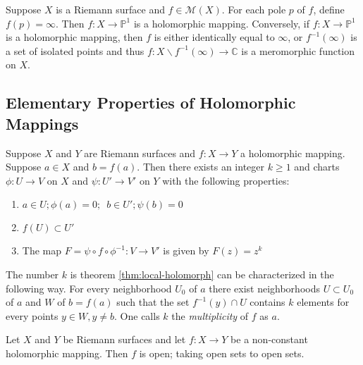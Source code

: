 \begin{thm}

Suppose $X$ is a Riemann surface and $f \in \mathcal{M}(X)$. For each pole $p$ of $f$, define $f(p)= \infty$. Then $f: X \to \mathbb{P}^1$ is a holomorphic mapping. Conversely, if $f: X \to \mathbb{P}^1$ is a holomorphic mapping, then $f$ is either identically equal to $\infty$, or $f^{-1}(\infty)$ is a set of isolated points and thus $f: X \backslash f^{-1}(\infty) \to \mathbb{C}$ is a meromorphic function on $X$.
\end{thm}

\subsection{Elementary Properties of Holomorphic Mappings}

\begin{thm}
\label{thm:local-holomorph}
Suppose $X$ and $Y$ are Riemann surfaces and $f: X \to Y$ a holomorphic mapping. Suppose $a \in X$ and $b = f(a)$. Then there exists an integer $k \geq 1$ and charts $\phi:U \to V$ on $X$ and $\psi: U' \to V'$ on $Y$ with the following properties:

\begin{enumerate}
    \item $a \in U; \phi(a)=0; \hspace{6pt} b \in U'; \psi(b)=0$
    \item $f(U) \subset U'$
    \item The map $F = \psi \circ f \circ \phi^{-1}: V \to V'$ is given by $F(z) = z^k$
\end{enumerate}


\end{thm}

\begin{rmk}

The number $k$ is theorem \ref{thm:local-holomorph} can be characterized in the following way. For every neighborhood $U_0$ of $a$ there exist neighborhoods $U \subset U_0$ of $a$ and $W$ of $b=f(a)$ such that the set $f^{-1}(y) \cap U$ contains $k$ elements for every points $y \in W, y \neq b$. One calls $k$ the \textit{multiplicity} of $f$ as $a$.

\end{rmk}

\begin{cor}

Let $X$ and $Y$ be Riemann surfaces and let $f: X \to Y$ be a non-constant holomorphic mapping. Then $f$ is open; taking open sets to open sets.

\end{cor}

